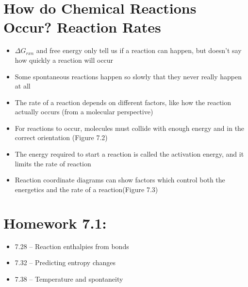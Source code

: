 \documentclass[12pt, openany, letterpaper]{memoir}
\begin{document}
\section{How do Chemical Reactions Occur? Reaction Rates}
\begin{itemize}
	\item $\Delta G_{rxn}$ and free energy only tell us if a reaction can happen, but doesn't say how quickly a reaction will occur
	\item Some spontaneous reactions happen so slowly that they never really happen at all
	\item The rate of a reaction depends on different factors, like how the reaction actually occurs (from a molecular perspective)
	\item For reactions to occur, molecules must collide with enough energy and in the correct orientation (Figure 7.2)
	\item The energy required to start a reaction is called the activation energy, and it limits the rate of reaction
	\item Reaction coordinate diagrams can show factors which control both the energetics and the rate of a reaction(Figure 7.3)
\end{itemize}

\section*{Homework 7.1:}
\begin{itemize}
	\item 7.28 -- Reaction enthalpies from bonds
	\item 7.32 -- Predicting entropy changes
	\item 7.38 -- Temperature and spontaneity
\end{itemize}
\end{document}
